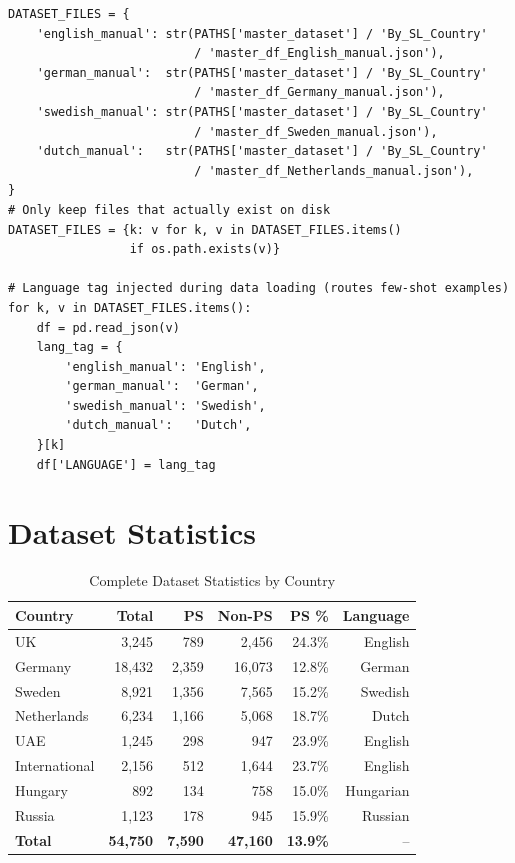\documentclass[11pt, titlepage, bibliography=totoc]{scrreprt}
\begin{document}
\begin{lstlisting}[label=lst:lang-files,
  caption={Language-to-dataset file mapping used to route each record to the appropriate few-shot example bank in Iteration~7.}]
DATASET_FILES = {
    'english_manual': str(PATHS['master_dataset'] / 'By_SL_Country'
                          / 'master_df_English_manual.json'),
    'german_manual':  str(PATHS['master_dataset'] / 'By_SL_Country'
                          / 'master_df_Germany_manual.json'),
    'swedish_manual': str(PATHS['master_dataset'] / 'By_SL_Country'
                          / 'master_df_Sweden_manual.json'),
    'dutch_manual':   str(PATHS['master_dataset'] / 'By_SL_Country'
                          / 'master_df_Netherlands_manual.json'),
}
# Only keep files that actually exist on disk
DATASET_FILES = {k: v for k, v in DATASET_FILES.items()
                 if os.path.exists(v)}

# Language tag injected during data loading (routes few-shot examples)
for k, v in DATASET_FILES.items():
    df = pd.read_json(v)
    lang_tag = {
        'english_manual': 'English',
        'german_manual':  'German',
        'swedish_manual': 'Swedish',
        'dutch_manual':   'Dutch',
    }[k]
    df['LANGUAGE'] = lang_tag
\end{lstlisting}

\section{Dataset Statistics}

\begin{table}[htbp]
\centering
\caption{Complete Dataset Statistics by Country}
\label{tab:appendix-dataset-stats}
\begin{tabular}{@{}lrrrrr@{}}
\toprule
\textbf{Country} & \textbf{Total} & \textbf{PS} & \textbf{Non-PS} & \textbf{PS \%} & \textbf{Language} \\
\midrule
UK & 3,245 & 789 & 2,456 & 24.3\% & English \\
Germany & 18,432 & 2,359 & 16,073 & 12.8\% & German \\
Sweden & 8,921 & 1,356 & 7,565 & 15.2\% & Swedish \\
Netherlands & 6,234 & 1,166 & 5,068 & 18.7\% & Dutch \\
UAE & 1,245 & 298 & 947 & 23.9\% & English \\
International & 2,156 & 512 & 1,644 & 23.7\% & English \\
Hungary & 892 & 134 & 758 & 15.0\% & Hungarian \\
Russia & 1,123 & 178 & 945 & 15.9\% & Russian \\
\midrule
\textbf{Total} & \textbf{54,750} & \textbf{7,590} & \textbf{47,160} & \textbf{13.9\%} & -- \\
\bottomrule
\end{tabular}
\end{table}
\end{document}
